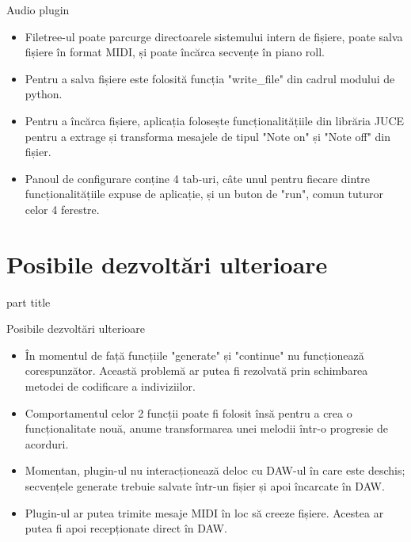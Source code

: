 \documentclass{beamer}
\begin{document}
\begin{frame}{Audio plugin}
    \begin{itemize}
        \item Filetree-ul poate parcurge directoarele sistemului intern de fișiere, poate salva fișiere în format MIDI, și poate încărca secvențe în piano roll.
        \item Pentru a salva fișiere este folosită funcția "write\_file" din cadrul modului de python.
        \item Pentru a încărca fișiere, aplicația folosește funcționalitățiile din librăria JUCE pentru a extrage și transforma mesajele de tipul "Note on" și "Note off" din fișier.
        \item Panoul de configurare conține 4 tab-uri, câte unul pentru fiecare dintre funcționalitățiile expuse de aplicație, și un buton de "run", comun tuturor celor 4 ferestre.
    \end{itemize}
\end{frame}

\section{Posibile dezvoltări ulterioare}
\begin{frame}
    \begin{centering}
        \begin{beamercolorbox}[sep=12pt,center,rounded=true]{part title}
            \insertsection\par
        \end{beamercolorbox}
    \end{centering}
\end{frame}

\begin{frame}{Posibile dezvoltări ulterioare}
    \begin{itemize}
        \item În momentul de față funcțiile "generate" și "continue" nu funcționează corespunzător. Această problemă ar putea fi rezolvată prin schimbarea metodei de codificare a indiviziilor. 
        \item Comportamentul celor 2 funcții poate fi folosit însă pentru a crea o funcționalitate nouă, anume transformarea unei melodii într-o progresie de acorduri.
        \item Momentan, plugin-ul nu interacționează deloc cu DAW-ul în care este deschis; secvențele generate trebuie salvate într-un fișier și apoi încarcate în DAW.
        \item Plugin-ul ar putea trimite mesaje MIDI în loc să creeze fișiere. Acestea ar putea fi apoi recepționate direct în DAW.
    \end{itemize}
\end{frame}
\end{document}
